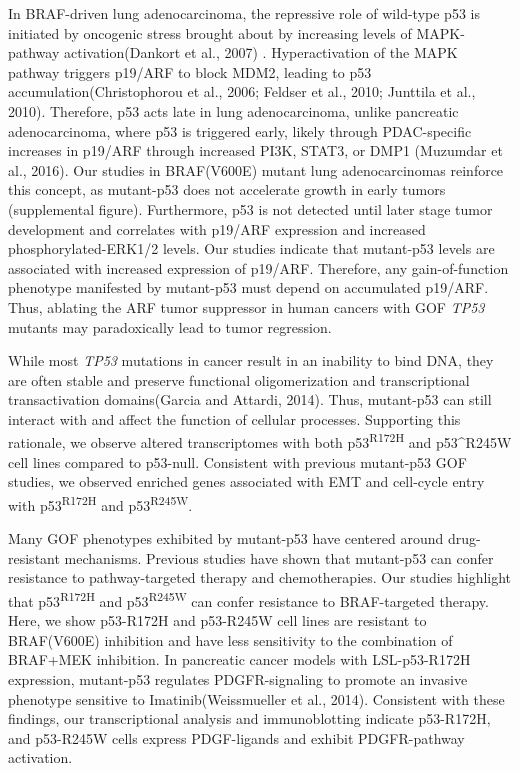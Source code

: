 In BRAF-driven lung adenocarcinoma, the repressive role of wild-type p53 is initiated by oncogenic stress brought about by increasing levels of MAPK-pathway activation(Dankort et al., 2007) . Hyperactivation of the MAPK pathway triggers p19/ARF to block MDM2, leading to p53 accumulation(Christophorou et al., 2006; Feldser et al., 2010; Junttila et al., 2010). Therefore, p53 acts late in lung adenocarcinoma, unlike pancreatic adenocarcinoma, where p53 is triggered early, likely through PDAC-specific increases in p19/ARF through increased PI3K, STAT3, or DMP1 (Muzumdar et al., 2016). Our studies in BRAF(V600E) mutant lung adenocarcinomas reinforce this concept, as mutant-p53 does not accelerate growth in early tumors (supplemental figure). Furthermore, p53 is not detected until later stage tumor development and correlates with p19/ARF expression and increased phosphorylated-ERK1/2 levels. Our studies indicate that mutant-p53 levels are associated with increased expression of p19/ARF. Therefore, any gain-of-function phenotype manifested by mutant-p53 must depend on accumulated p19/ARF. Thus, ablating the ARF tumor suppressor in human cancers with GOF \emph{TP53} mutants may paradoxically lead to tumor regression.

While most \emph{TP53} mutations in cancer result in an inability to bind DNA, they are often stable and preserve functional oligomerization and transcriptional transactivation domains(Garcia and Attardi, 2014). Thus, mutant-p53 can still interact with and affect the function of cellular processes. Supporting this rationale, we observe altered transcriptomes with both p53\textsuperscript{R172H} and p53\^{}R245W cell lines compared to p53-null. Consistent with previous mutant-p53 GOF studies, we observed enriched genes associated with EMT and cell-cycle entry with p53\textsuperscript{R172H} and p53\textsuperscript{R245W}.

Many GOF phenotypes exhibited by mutant-p53 have centered around drug-resistant mechanisms. Previous studies have shown that mutant-p53 can confer resistance to pathway-targeted therapy and chemotherapies. Our studies highlight that p53\textsuperscript{R172H} and p53\textsuperscript{R245W} can confer resistance to BRAF-targeted therapy. Here, we show p53-R172H and p53-R245W cell lines are resistant to BRAF(V600E) inhibition and have less sensitivity to the combination of BRAF+MEK inhibition. In pancreatic cancer models with LSL-p53-R172H expression, mutant-p53 regulates PDGFR-signaling to promote an invasive phenotype sensitive to Imatinib(Weissmueller et al., 2014). Consistent with these findings, our transcriptional analysis and immunoblotting indicate p53-R172H, and p53-R245W cells express PDGF-ligands and exhibit PDGFR-pathway activation.

